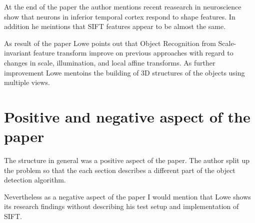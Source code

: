 \documentclass[11pt, a4paper]{article} %
\begin{document}
At the end of the paper the author mentions recent reasearch in neuroscience show that neurons in inferior temporal cortex respond to shape features. In addition he meintions that SIFT features appear to be almost the same.

As result of the paper Lowe points out that Object Recognition from Scale-invariant feature transform improve on previous approaches with regard to changes in scale, illumination, and local affine transforms.
As further improvement Lowe mentoins the building of 3D structures of the objects using multiple views.

\section{Positive and negative aspect of the paper}
The structure in general was a positive aspect of the paper. The author split up the problem so that the each section describes a different part of the object detection algorithm.

Nevertheless as a negative aspect of the paper I would mention that Lowe shows its research findings without describing his test setup and implementation of SIFT.

\nocite{*}



\end{document}
